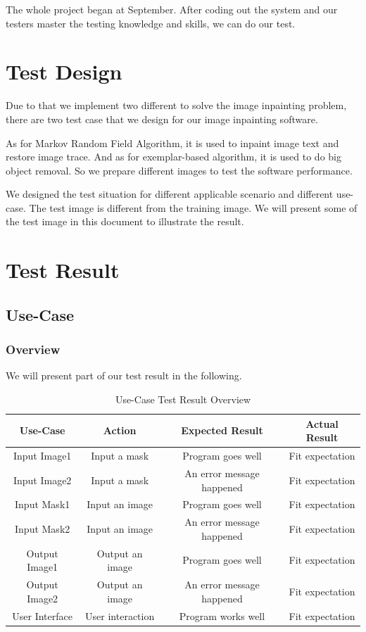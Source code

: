 The whole project began at September. After coding out the system and our testers master the testing knowledge and skills, we can do our test. 

\section{Test Design}
\qquad Due to that we implement two different to solve the image inpainting problem, there are two test case that we design for our image inpainting software.

As for Markov Random Field Algorithm, it is used to inpaint image text and restore image trace. And as for exemplar-based algorithm, it is used to do big object removal. So we prepare different images to test the software performance. 

We designed the test situation for different applicable scenario and different use-case. The test image is different from the training image. We will present some of the test image in this document to illustrate the result.

\section{Test Result}
\subsection{Use-Case}
\subsubsection*{Overview}
\qquad We will present part of our test result in the following.
\begin{table}[H]
	\centering
	\begin{tabular}{|c|c|c|c|}
		\hline
		Use-Case & Action & Expected Result& Actual Result\\
		\hline
		Input Image1 & Input a mask & Program goes well& Fit expectation\\
		\hline
		Input Image2 & Input a mask & An error message happened & Fit expectation\\
		\hline
		Input Mask1 & Input an image & Program goes well& Fit expectation\\
		\hline
		Input Mask2 & Input an image & An error message happened& Fit expectation\\
		\hline
		Output Image1 & Output an image & Program goes well& Fit expectation\\
		\hline
		Output Image2 & Output an image & An error message happened& Fit expectation\\
		\hline
		User Interface & User interaction & Program works well& Fit expectation\\
		\hline
	\end{tabular}
	\caption{Use-Case Test Result Overview}
\end{table}
